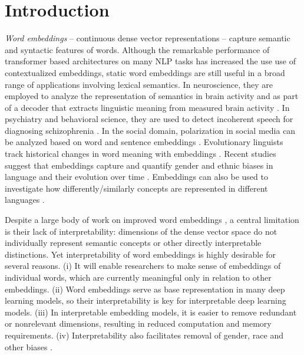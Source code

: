 \documentclass[11pt,a4paper]{article}
\begin{document}
\section{Introduction}\label{sec:intro}

\emph{Word embeddings} \citep{mikolov13word2vec_a,mikolov13word2vec_b,pennington14glove,bojanowski2017enriching}
-- continuous dense vector representations --
capture semantic and syntactic features
of words. 
Although the remarkable performance of transformer based
architectures
\citep{vaswani17transformers,devlin19BERT,Radford19GPT2} on
many NLP tasks has increased the use use of contextualized embeddings, static word embeddings are still useful in a broad range of applications involving lexical semantics. 
In neuroscience, they are employed to analyze the representation of semantics in brain
activity
\citep{ruan16brainActivity,huth16semanticMaps,zhang20connecting} and as part of a
decoder that extracts linguistic meaning from measured brain
activity \citep{pereira18universalDecoder}. 
In psychiatry and behavioral science, they are used to detect incoherent speech for diagnosing schizophrenia
\citep{iter2018automatic}.
In the social domain, polarization in social media \citep{demszky19analyzing} can be analyzed based on word and sentence embeddings \citep{demszky19analyzing}. 
Evolutionary linguists track historical changes in word meaning with embeddings \citep{hamilton16diachronic,kutuzov18diachronic}. 
Recent studies suggest that embeddings  capture and quantify gender and ethnic biases in language \citep{bolukbasi16debiasing,garg18gender100years,caliskan17humanLikeBiases} and their evolution over time \citep{agarwal2019word}. 
Embeddings can also be used to investigate how differently/similarly concepts are represented in different languages
\citep{senel17crossLingual,senel18atlas}.

Despite a large body of work on improved word embeddings
\citep{yu2017refining, celikyilmaz15enriching,
  yu14improving, liu15learning, mrksic16counterFitting,
  bollegala16joint, yang16fineTuning}, a central limitation
is their lack of interpretability: dimensions of the dense vector
space do not individually represent semantic concepts
\citep{chen16InfoGAN,levy14dependency} or other directly
interpretable distinctions.
Yet interpretability of word embeddings is highly desirable
for several reasons. 
(i) It will enable researchers to make sense of embeddings
of individual words,  which are currently meaningful only in relation to other embeddings.
(ii) Word embeddings serve as base representation in many deep learning models, so their interpretability is key for interpretable deep learning models.
(iii) In interpretable embedding models, it is easier to remove redundant or nonrelevant dimensions, resulting in reduced computation and memory requirements.
(iv) Interpretability also facilitates removal of gender, race and other biases \citep{dufter19ultraDense}.
\end{document}
